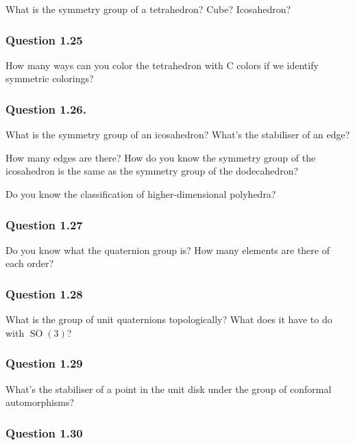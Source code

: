 What is the symmetry group of a tetrahedron? Cube? Icosahedron?

\hypertarget{question-1.25}{%
\subsubsection{Question 1.25}\label{question-1.25}}

How many ways can you color the tetrahedron with C colors if we identify
symmetric colorings?

\hypertarget{question-1.26.}{%
\subsubsection{Question 1.26.}\label{question-1.26.}}

What is the symmetry group of an icosahedron? What's the stabiliser of
an edge?

How many edges are there? How do you know the symmetry group of the
icosahedron is the same as the symmetry group of the dodecahedron?

Do you know the classification of higher-dimensional polyhedra?

\hypertarget{question-1.27}{%
\subsubsection{Question 1.27}\label{question-1.27}}

Do you know what the quaternion group is? How many elements are there of
each order?

\hypertarget{question-1.28}{%
\subsubsection{Question 1.28}\label{question-1.28}}

What is the group of unit quaternions topologically? What does it have
to do with \({\operatorname{SO}}(3)\)?

\hypertarget{question-1.29}{%
\subsubsection{Question 1.29}\label{question-1.29}}

What's the stabiliser of a point in the unit disk under the group of
conformal automorphisms?

\hypertarget{question-1.30}{%
\subsubsection{Question 1.30}\label{question-1.30}}

